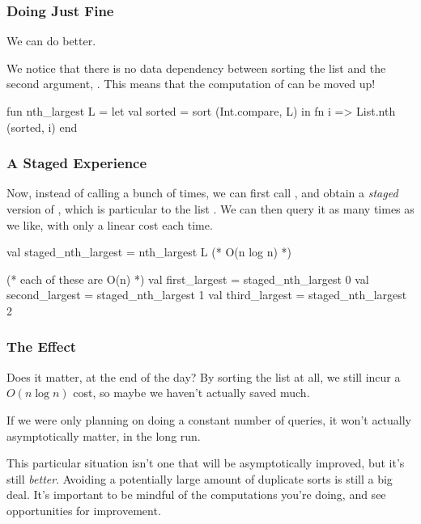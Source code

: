 \documentclass[aspectratio=169, handout]{beamer}
\begin{document}
\begin{frame}[fragile]
  \frametitle{Doing Just Fine}

  We can do better.

  \pause
  \vspace{\fill}

  We notice that there is no data dependency between sorting the list and
  the second argument, . This means that the computation of
   can be moved up!

  \pause
  \vspace{\fill}

  \begin{codeblock}
    fun nth_largest L =
      let
        val sorted = sort (Int.compare, L)
      in
        fn i => List.nth (sorted, i)
      end
  \end{codeblock}
\end{frame}

\begin{frame}[fragile]
  \frametitle{A Staged Experience}

  Now, instead of calling  a bunch of times, we can first
  call , and obtain a \textit{staged} version of
  , which is particular to the list . We can then query
  it as many times as we like, with only a linear cost each time.

  \pause
  \vspace{\fill}

  \begin{codeblock}
    val staged_nth_largest = nth_largest L (* O(n log n) *)

    (* each of these are O(n) *)
    val first_largest = staged_nth_largest 0
    val second_largest = staged_nth_largest 1
    val third_largest = staged_nth_largest 2
  \end{codeblock}
\end{frame}

\begin{frame}[fragile]
  \frametitle{The Effect}

  Does it matter, at the end of the day? By sorting the list at all, we still
  incur a $O(n \log n)$ cost, so maybe we haven't actually saved much.

  \pause
  \vspace{\fill}

  If we were only planning on doing a constant number of queries, it won't actually
  asymptotically matter, in the long run.

  \pause
  \vspace{\fill}

  This particular situation isn't one that will be asymptotically improved, but
  it's still \textit{better}. Avoiding a potentially large amount of duplicate
  sorts is still a big deal. It's important to be mindful of the computations
  you're doing, and see opportunities for improvement.
\end{frame}
\end{document}
